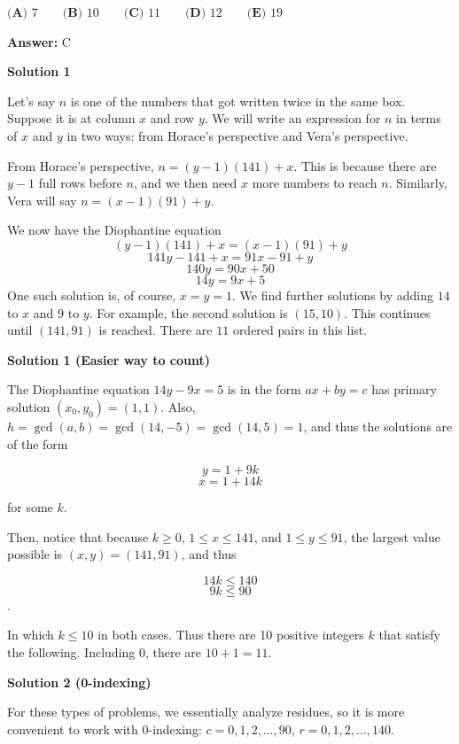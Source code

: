 \begin{enumerate}
 $\textbf{(A) } 7 \qquad \textbf{(B) } 10 \qquad \textbf{(C) } 11 \qquad \textbf{(D) } 12 \qquad \textbf{(E) } 19$

 \textbf{Answer: }C



\textbf{Solution 1}

Let's say $n$ is one of the numbers that got written twice in the same box. Suppose it is at column $x$ and row $y$. We will write an expression for $n$ in terms of $x$ and $y$ in two ways: from Horace's perspective and Vera's perspective.

 From Horace's perspective, $n = (y-1)(141) + x$. This is because there are $y-1$ full rows before $n$, and we then need $x$ more numbers to reach $n$. Similarly, Vera will say $n = (x-1)(91) + y$.

 We now have the Diophantine equation
 \[(y-1)(141) + x = (x-1)(91)+y\]
 \[141y-141+x = 91x-91+y\]
 \[140y=90x+50\]
 \[14y = 9x + 5\]One such solution is, of course, $x=y=1$. We find further solutions by adding $14$ to $x$ and $9$ to $y$. For example, the second solution is $(15,10)$. This continues until $(141,91)$ is reached. There are $\boxed{11}$ ordered pairs in this list.

 



\textbf{Solution 1 (Easier way to count)}

The Diophantine equation $14y-9x=5$ is in the form $ax+by = c$ has primary solution $(x_0, y_0) = (1,1)$. Also, $h = \gcd(a,b) =\gcd(14, -5) = \gcd(14,5) = 1$, and thus the solutions are of the form

 
 \[y = 1 + 9k\]
 \[x = 1 + 14k\]

 for some $k$.

 Then, notice that because $k \ge 0$, $1 \le x \le 141$, and $1 \le y \le 91$, the largest value possible is $(x,y) = (141, 91)$, and thus

 
 \[14k \le 140\]
 \[9k \le 90\].

 In which $k \le 10$ in both cases. Thus there are 10 positive integers $k$ that satisfy the following. Including 0, there are $10 + 1 = \boxed{11}$.

 



\textbf{Solution 2 (0-indexing)}

For these types of problems, we essentially analyze residues, so it is more convenient to work with 0-indexing: $c=0,1,2,\dots,90$, $r=0,1,2,\dots,140$.


\end{enumerate}
